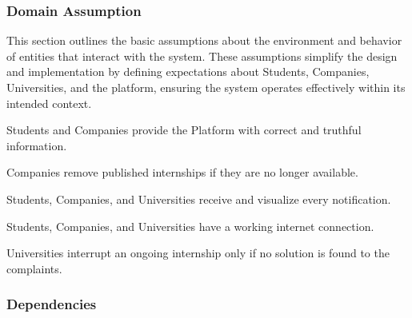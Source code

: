 \subsubsection{Domain Assumption}
This section outlines the basic assumptions about the environment and behavior of entities that interact with the system. These assumptions simplify the design and implementation by defining expectations about Students, Companies, Universities, and the platform, ensuring the system operates effectively within its intended context.
\begin{enumerate}[label={\color{titleColor}[D\arabic*]}]
\item Students and Companies provide the Platform with correct and truthful information.
\item Companies remove published internships if they are no longer available.
\item Students, Companies, and Universities receive and visualize every notification.
\item Students, Companies, and Universities have a working internet connection.
\item Universities interrupt an ongoing internship only if no solution is found to the complaints.
\end{enumerate}
\subsubsection{Dependencies}
